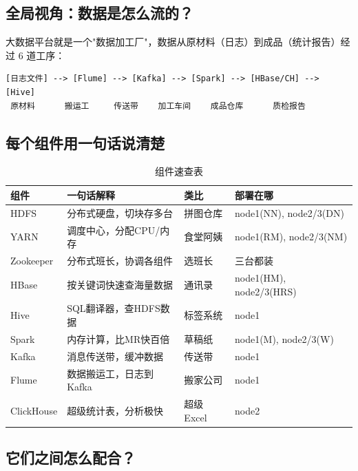 \documentclass[12pt,a4paper]{article}
\begin{document}
\subsection{全局视角：数据是怎么流的？}

\begin{theorybox}[一句话理解整个系统]
大数据平台就是一个"数据加工厂"，数据从原材料（日志）到成品（统计报告）经过 6 道工序：

\begin{footnotesize}
\begin{verbatim}
[日志文件] --> [Flume] --> [Kafka] --> [Spark] --> [HBase/CH] --> [Hive]
 原材料      搬运工     传送带    加工车间    成品仓库      质检报告
\end{verbatim}
\end{footnotesize}
\end{theorybox}

\subsection{每个组件用一句话说清楚}

\begin{table}[H]
\centering
\caption{组件速查表}
{\footnotesize
\begin{tabular}{llll}
\toprule
\textbf{组件} & \textbf{一句话解释} & \textbf{类比} & \textbf{部署在哪} \\
\midrule
HDFS & 分布式硬盘，切块存多台 & 拼图仓库 & node1(NN), node2/3(DN) \\
YARN & 调度中心，分配CPU/内存 & 食堂阿姨 & node1(RM), node2/3(NM) \\
Zookeeper & 分布式班长，协调各组件 & 选班长 & 三台都装 \\
HBase & 按关键词快速查海量数据 & 通讯录 & node1(HM), node2/3(HRS) \\
Hive & SQL翻译器，查HDFS数据 & 标签系统 & node1 \\
Spark & 内存计算，比MR快百倍 & 草稿纸 & node1(M), node2/3(W) \\
Kafka & 消息传送带，缓冲数据 & 传送带 & node1 \\
Flume & 数据搬运工，日志到Kafka & 搬家公司 & node1 \\
ClickHouse & 超级统计表，分析极快 & 超级Excel & node2 \\
\bottomrule
\end{tabular}
}
\end{table}

\subsection{它们之间怎么配合？}
\end{document}
